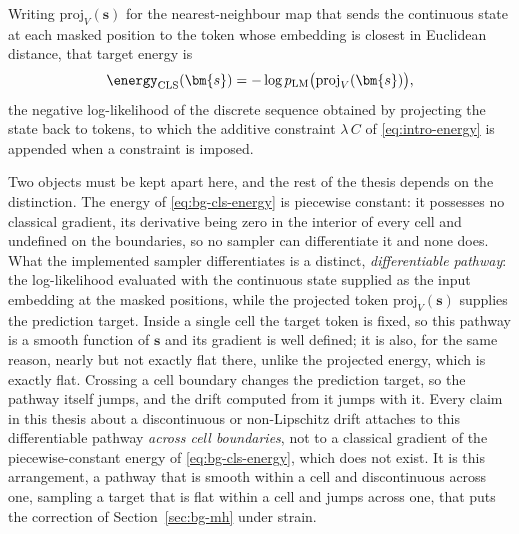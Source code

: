 Writing $\mathrm{proj}_V(\bm{s})$ for the nearest-neighbour map that sends the continuous state at each masked position to the token whose embedding is closest in Euclidean distance, that target energy is
\begin{equation}
    \energy_{\text{CLS}}(\bm{s}) = -\log p_{\text{LM}}\bigl(\mathrm{proj}_V(\bm{s})\bigr),
    \label{eq:bg-cls-energy}
\end{equation}
the negative log-likelihood of the discrete sequence obtained by projecting the state back to tokens, to which the additive constraint $\lambda\, C$ of \eqref{eq:intro-energy} is appended when a constraint is imposed.

Two objects must be kept apart here, and the rest of the thesis depends on the distinction. The energy of \eqref{eq:bg-cls-energy} is piecewise constant: it possesses no classical gradient, its derivative being zero in the interior of every cell and undefined on the boundaries, so no sampler can differentiate it and none does. What the implemented sampler differentiates is a distinct, \emph{differentiable pathway}: the log-likelihood evaluated with the continuous state supplied as the input embedding at the masked positions, while the projected token $\mathrm{proj}_V(\bm{s})$ supplies the prediction target.
Inside a single cell the target token is fixed, so this pathway is a smooth function of $\bm{s}$ and its gradient is well defined; it is also, for the same reason, nearly but not exactly flat there, unlike the projected energy, which is exactly flat. Crossing a cell boundary changes the prediction target, so the pathway itself jumps, and the drift computed from it jumps with it. Every claim in this thesis about a discontinuous or non-Lipschitz drift attaches to this differentiable pathway \emph{across cell boundaries}, not to a classical gradient of the piecewise-constant energy of \eqref{eq:bg-cls-energy}, which does not exist. It is this arrangement, a pathway that is smooth within a cell and discontinuous across one, sampling a target that is flat within a cell and jumps across one, that puts the correction of Section~\ref{sec:bg-mh} under strain.
